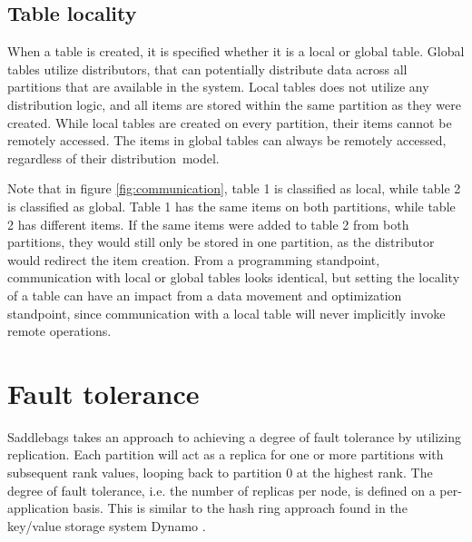 \documentclass{uit-report}
\begin{document}
\subsection{Table locality}
When a table is created, it is specified whether it is a local or global table. Global tables utilize distributors, that can potentially distribute data across all partitions that are available in the system. Local tables does not utilize any distribution logic, and all items are stored within the same partition as they were created. While local tables are created on every partition, their items cannot be remotely accessed. The items in global tables can always be remotely accessed, regardless of their distribution~model.

Note that in figure \ref{fig:communication}, table 1 is classified as local, while table 2 is classified as global. Table 1 has the same items on both partitions, while table 2 has different items. If the same items were added to table 2 from both partitions, they would still only be stored in one partition, as the distributor would redirect the item creation. From a programming standpoint, communication with local or global tables looks identical, but setting the locality of a table can have an impact from a data movement and optimization standpoint, since communication with a local table will never implicitly invoke remote operations.




\section{Fault tolerance}
Saddlebags takes an approach to achieving a degree of fault tolerance by utilizing replication. Each partition will act as a replica for one or more partitions with subsequent rank values, looping back to partition 0 at the highest rank. The degree of fault tolerance, i.e. the number of replicas per node, is defined on a per-application basis. This is similar to the hash ring approach found in the key/value storage system Dynamo \cite{dynamo}.
\end{document}
